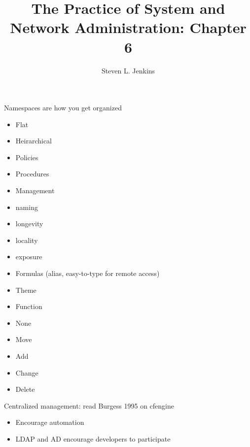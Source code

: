 \documentclass{slides}
\title{The Practice of System and Network Administration: Chapter 6}
\author{Steven L. Jenkins}
\newcommand{\bi}{\begin{itemize}}
\newcommand{\ei}{\end{itemize}}
\begin{document}


Namespaces are how you get organized


\bi
\item Flat
\item Heirarchical
\ei


\bi
\item Policies
\item Procedures
\item Management
\ei


\bi
\item naming
\item longevity
\item locality
\item exposure
\ei


\bi
\item Formulas (alias, easy-to-type for remote access)
\item Theme
\item Function
\item None
\ei


\bi
\item Move
\item Add
\item Change
\item Delete
\ei



Centralized management: read Burgess 1995 on cfengine


\bi
\item Encourage automation
\item LDAP and AD encourage developers to participate
\ei
\end{document}
